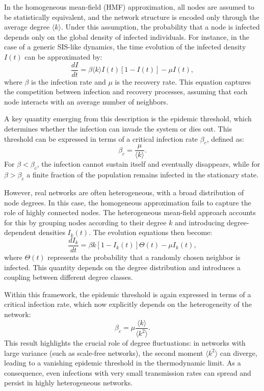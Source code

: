 In the homogeneous mean-field (HMF) approximation, all nodes are assumed to be statistically equivalent, and the network structure is encoded only through the average degree $\langle k \rangle$. Under this assumption, the probability that a node is infected depends only on the global density of infected individuals. For instance, in the case of a generic SIS-like dynamics, the time evolution of the infected density $I(t)$ can be approximated by:
\begin{equation}
\frac{dI}{dt} = \beta \langle k \rangle I(t)\left[1 - I(t)\right] - \mu I(t),
\end{equation}
where $\beta$ is the infection rate and $\mu$ is the recovery rate. This equation captures the competition between infection and recovery processes, assuming that each node interacts with an average number of neighbors.

A key quantity emerging from this description is the epidemic threshold, which determines whether the infection can invade the system or dies out. This threshold can be expressed in terms of a critical infection rate $\beta_c$, defined as:
\begin{equation}
\beta_c = \frac{\mu}{\langle k \rangle}.
\end{equation}
For $\beta < \beta_c$, the infection cannot sustain itself and eventually disappears, while for $\beta > \beta_c$ a finite fraction of the population remains infected in the stationary state.

However, real networks are often heterogeneous, with a broad distribution of node degrees. In this case, the homogeneous approximation fails to capture the role of highly connected nodes. The heterogeneous mean-field approach accounts for this by grouping nodes according to their degree $k$ and introducing degree-dependent densities $I_k(t)$. The evolution equations then become:
\begin{equation}
\frac{dI_k}{dt} = \beta k \left[1 - I_k(t)\right] \Theta(t) - \mu I_k(t),
\end{equation}
where $\Theta(t)$ represents the probability that a randomly chosen neighbor is infected. This quantity depends on the degree distribution and introduces a coupling between different degree classes.

Within this framework, the epidemic threshold is again expressed in terms of a critical infection rate, which now explicitly depends on the heterogeneity of the network:
\begin{equation}
\beta_c = \mu \frac{\langle k \rangle}{\langle k^2 \rangle}.
\end{equation}
This result highlights the crucial role of degree fluctuations: in networks with large variance (such as scale-free networks), the second moment $\langle k^2 \rangle$ can diverge, leading to a vanishing epidemic threshold in the thermodynamic limit. As a consequence, even infections with very small transmission rates can spread and persist in highly heterogeneous networks.


